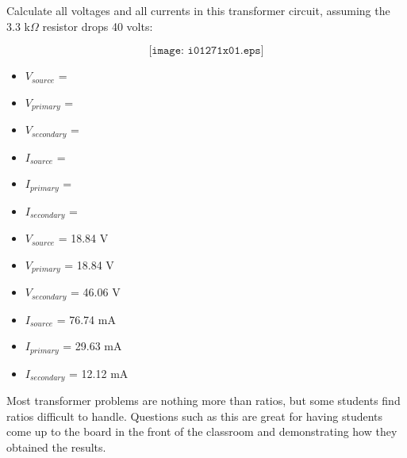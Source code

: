

Calculate all voltages and all currents in this transformer circuit, assuming the 3.3 k$\Omega$ resistor drops 40 volts:

$$\texttt{[image: i01271x01.eps]}$$

\begin{itemize}
\item{} $V_{source}$ = 
\item{} $V_{primary}$ = 
\item{} $V_{secondary}$ = 
\item{} $I_{source}$ =  
\item{} $I_{primary}$ = 
\item{} $I_{secondary}$ = 
\end{itemize}







\begin{itemize}
\item{} $V_{source}$ = 18.84 V
\item{} $V_{primary}$ = 18.84 V
\item{} $V_{secondary}$ = 46.06 V
\item{} $I_{source}$ = 76.74 mA
\item{} $I_{primary}$ = 29.63 mA
\item{} $I_{secondary}$ = 12.12 mA
\end{itemize}







Most transformer problems are nothing more than ratios, but some students find ratios difficult to handle.  Questions such as this are great for having students come up to the board in the front of the classroom and demonstrating how they obtained the results.




